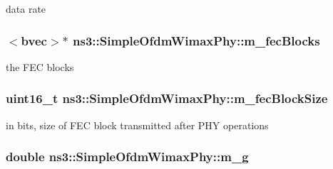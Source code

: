 data rate 

\subsubsection[{\texorpdfstring{m\+\_\+fec\+Blocks}{m_fecBlocks}}]{$<${\bf bvec}$>$$\ast$ ns3\+::\+Simple\+Ofdm\+Wimax\+Phy\+::m\+\_\+fec\+Blocks\hspace{0.3cm}{\ttfamily [private]}}\hypertarget{classns3_1_1SimpleOfdmWimaxPhy_a921e235788fdd0b13036fcea9ee2b2c0}{}\label{classns3_1_1SimpleOfdmWimaxPhy_a921e235788fdd0b13036fcea9ee2b2c0}


the F\+EC blocks 

\subsubsection[{\texorpdfstring{m\+\_\+fec\+Block\+Size}{m_fecBlockSize}}]{\setlength{\rightskip}{0pt plus 5cm}uint16\+\_\+t ns3\+::\+Simple\+Ofdm\+Wimax\+Phy\+::m\+\_\+fec\+Block\+Size\hspace{0.3cm}{\ttfamily [private]}}\hypertarget{classns3_1_1SimpleOfdmWimaxPhy_af3ac909865bf5afa9a68c4b17b0313a3}{}\label{classns3_1_1SimpleOfdmWimaxPhy_af3ac909865bf5afa9a68c4b17b0313a3}


in bits, size of F\+EC block transmitted after P\+HY operations 

\subsubsection[{\texorpdfstring{m\+\_\+g}{m_g}}]{\setlength{\rightskip}{0pt plus 5cm}double ns3\+::\+Simple\+Ofdm\+Wimax\+Phy\+::m\+\_\+g\hspace{0.3cm}{\ttfamily [private]}}\hypertarget{classns3_1_1SimpleOfdmWimaxPhy_a501cb2246de395d3cad20931fe1d762a}{}\label{classns3_1_1SimpleOfdmWimaxPhy_a501cb2246de395d3cad20931fe1d762a}


